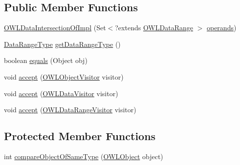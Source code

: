 \subsection*{Public Member Functions}
\begin{DoxyCompactItemize}
\item 
\hyperlink{classuk_1_1ac_1_1manchester_1_1cs_1_1owl_1_1owlapi_1_1_o_w_l_data_intersection_of_impl_a334f05f045c5833bb20a93391e58d555}{O\-W\-L\-Data\-Intersection\-Of\-Impl} (Set$<$?extends \hyperlink{interfaceorg_1_1semanticweb_1_1owlapi_1_1model_1_1_o_w_l_data_range}{O\-W\-L\-Data\-Range} $>$ \hyperlink{classuk_1_1ac_1_1manchester_1_1cs_1_1owl_1_1owlapi_1_1_o_w_l_nary_data_range_impl_a4536392a3f3322085f03875bc3ac1ef1}{operands})
\item 
\hyperlink{enumorg_1_1semanticweb_1_1owlapi_1_1model_1_1_data_range_type}{Data\-Range\-Type} \hyperlink{classuk_1_1ac_1_1manchester_1_1cs_1_1owl_1_1owlapi_1_1_o_w_l_data_intersection_of_impl_ae9dc384118fc7f8de50739ca02aac4f3}{get\-Data\-Range\-Type} ()
\item 
boolean \hyperlink{classuk_1_1ac_1_1manchester_1_1cs_1_1owl_1_1owlapi_1_1_o_w_l_data_intersection_of_impl_af94a65d2458208e7b4f3e6e516c08ad6}{equals} (Object obj)
\item 
void \hyperlink{classuk_1_1ac_1_1manchester_1_1cs_1_1owl_1_1owlapi_1_1_o_w_l_data_intersection_of_impl_a422c22963a1325c58870df35e24b1121}{accept} (\hyperlink{interfaceorg_1_1semanticweb_1_1owlapi_1_1model_1_1_o_w_l_object_visitor}{O\-W\-L\-Object\-Visitor} visitor)
\item 
void \hyperlink{classuk_1_1ac_1_1manchester_1_1cs_1_1owl_1_1owlapi_1_1_o_w_l_data_intersection_of_impl_a05db0d264f8d7471547bf3b07b20e588}{accept} (\hyperlink{interfaceorg_1_1semanticweb_1_1owlapi_1_1model_1_1_o_w_l_data_visitor}{O\-W\-L\-Data\-Visitor} visitor)
\item 
void \hyperlink{classuk_1_1ac_1_1manchester_1_1cs_1_1owl_1_1owlapi_1_1_o_w_l_data_intersection_of_impl_aa5d78fb40828d06e0485ea2178d7e974}{accept} (\hyperlink{interfaceorg_1_1semanticweb_1_1owlapi_1_1model_1_1_o_w_l_data_range_visitor}{O\-W\-L\-Data\-Range\-Visitor} visitor)
\end{DoxyCompactItemize}
\subsection*{Protected Member Functions}
\begin{DoxyCompactItemize}
\item 
int \hyperlink{classuk_1_1ac_1_1manchester_1_1cs_1_1owl_1_1owlapi_1_1_o_w_l_data_intersection_of_impl_a3cc990587ee043c59b224417b9ec0fae}{compare\-Object\-Of\-Same\-Type} (\hyperlink{interfaceorg_1_1semanticweb_1_1owlapi_1_1model_1_1_o_w_l_object}{O\-W\-L\-Object} object)
\end{DoxyCompactItemize}
